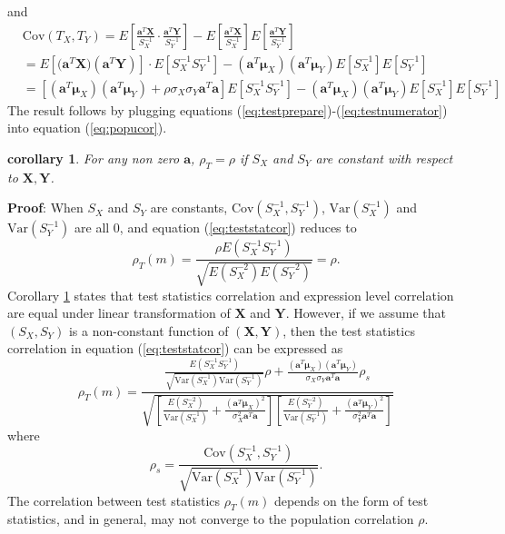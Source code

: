 \documentclass[12pt, a4paper]{article}
\newtheorem{corollary}{corollary}
\newcommand{\cov}{\text{Cov}}
\newcommand{\var}{\text{Var}}
\begin{document}
	and
	\begin{equation}\label{eq:testnumerator}
	\begin{aligned}
		&\cov(T_X, T_Y) = E\left[\frac{ \bm a^T\bm X }{S_X^{-1}}\cdot\frac{ \bm a^T\bm Y }{S_Y^{-1}}\right] - E\left[\frac{\bm a^T\bm X}{S_X^{-1}}\right]E\left[\frac{\bm a^T\bm Y}{S_Y^{-1}}\right] \\
			 & = E[\bm (\bm a^T\bm X)(\bm a^T\bm Y)]\cdot E[S_X^{-1}S_Y^{-1}]-(\bm a^T\bm \mu_X)(\bm a^T\bm \mu_Y)E[S_X^{-1}]E[S_Y^{-1}]\\
			 & = [(\bm a^T\bm \mu_X)(\bm a^T\bm \mu_Y)+ \rho \sigma_X\sigma_Y\bm a^T\bm a]E[S_X^{-1}S_Y^{-1}]- (\bm a^T\bm \mu_X)(\bm a^T\bm \mu_Y)E[S_X^{-1}]E[S_Y^{-1}]
	\end{aligned}
	\end{equation}	
	The result follows by plugging equations (\ref{eq:testprepare})-(\ref{eq:testnumerator}) into equation (\ref{eq:popucor}).
	
	\begin{corollary}\label{thm:lineartransformation} 
		For any non zero $\bm a$, $\rho_T=\rho$ if $S_X$ and $S_Y$ are constant with respect to $\bm X, \bm Y$. 
	\end{corollary}
	\textbf{Proof}: When $S_X$ and $S_Y$ are constants, $\cov(S_X^{-1}, S_Y^{-1})$, $\var(S_X^{-1}) $ and $\var(S_Y^{-1})$ are all 0, and equation (\ref{eq:teststatcor}) reduces to 
	\begin{equation}
		\rho_T(m) = \frac{\rho E(S_X^{-1}S_Y^{-1})}{\sqrt{E(S_X^{-2})E(S_Y^{-2})}} = \rho.
	\end{equation}
	Corollary \ref{thm:lineartransformation} states that test statistics correlation and expression 
	level correlation are equal under linear transformation of $\bm X$ and $\bm Y$. However, if we 
	assume that $(S_X, S_Y)$ is a non-constant function of $(\bm X, \bm Y)$, then the test 
	statistics correlation in equation (\ref{eq:teststatcor}) can be expressed as  
	\begin{equation}
		\rho_T(m) = \frac{ \frac{E(S_X^{-1}S_Y^{-1})}
			{\sqrt{\var(S_X^{-1})\var(S_Y^{-1})}}\rho + \frac{(\bm a^T\bm \mu_X)(\bm a^T\bm \mu_Y)}{\sigma_X\sigma_Y\bm a^T\bm a} \rho_s	
		}{\sqrt{\left[ \frac{E(S_X^{-2})}{\var(S_X^{-1})} + \frac{(\bm a^T\bm \mu_X)^2}{\sigma_X^2\bm a^T\bm a}\right]\left[ \frac{E(S_Y^{-2})}{\var(S_Y^{-1})} + \frac{(\bm a^T\bm \mu_Y)^2}{\sigma_Y^2\bm a^T\bm a}\right]}} 
	\end{equation}
	where 
	\begin{equation}
	 \rho_s = \frac{\cov(S_X^{-1},S_Y^{-1})}{\sqrt{\var(S_X^{-1})\var(S_Y^{-1})}}.
	\end{equation}
	The correlation between test statistics $\rho_T(m)$ depends on the form of test statistics, and 
	in general,  may not converge to the population correlation $\rho$. 
	
\end{document}
